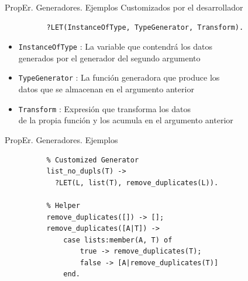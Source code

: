 \documentclass{beamer}
\begin{document}
      \begin{frame}[fragile]{PropEr. Generadores. Ejemplos}
        Customizados por el desarrollador
        \begin{verbatim}
          ?LET(InstanceOfType, TypeGenerator, Transform).
        \end{verbatim}
        \begin{itemize}
          \item \texttt{InstanceOfType} : La variable que contendrá los datos\\
          generados por el generador del segundo argumento
          \item \texttt{TypeGenerator} : La función generadora que produce los\\
          datos que se almacenan en el argumento anterior
          \item \texttt{Transform} : Expresión que transforma los datos\\
          de la propia función y los acumula en el argumento anterior
        \end{itemize}
      \end{frame}

      \begin{frame}[fragile]{PropEr. Generadores. Ejemplos}
        \begin{verbatim}
          % Customized Generator
          list_no_dupls(T) ->
            ?LET(L, list(T), remove_duplicates(L)).

          % Helper
          remove_duplicates([]) -> [];
          remove_duplicates([A|T]) ->
              case lists:member(A, T) of
                  true -> remove_duplicates(T);
                  false -> [A|remove_duplicates(T)]
              end.
        \end{verbatim}
      \end{frame}
\end{document}
